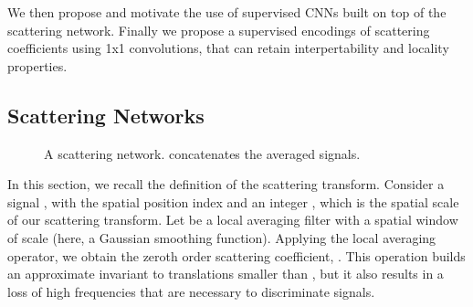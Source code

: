 \documentclass[10pt,twocolumn,letterpaper]{article}
\begin{document}
We then propose and motivate the use of  supervised CNNs built on top of the scattering network. Finally we propose a supervised encodings of scattering coefficients using 1x1 convolutions, that can retain interpertability and locality properties.






\subsection{Scattering Networks}
\label{scatnet}









\begin{figure}\begin{center}
\label{archi}


 
  

\end{center}
\caption{A scattering network.  concatenates the averaged signals.}
\end{figure}




In this section, we recall the definition of the scattering transform. Consider a signal , with  the spatial position index and an integer , which is the spatial scale of our scattering transform. Let  be a local averaging filter with a spatial window of scale  (here, a Gaussian smoothing function). Applying the local averaging operator,  we obtain the zeroth order scattering coefficient, . This operation builds an approximate invariant to translations smaller than , but it also results in a loss of high frequencies that are necessary to discriminate signals. 
\end{document}
